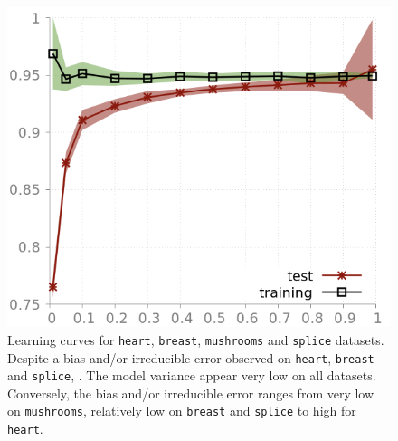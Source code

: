 \documentclass[preprint,12pt]{elsarticle}
\theoremstyle{definition}
\begin{document}
\begin{figure}[!h]
\hfill
\includegraphics[scale=0.3]{img/learning_curve_splice.png}
\caption{Learning curves for \texttt{heart}, \texttt{breast}, \texttt{mushrooms} and \texttt{splice} datasets. Despite a bias and/or irreducible error observed on  \texttt{heart}, \texttt{breast} and \texttt{splice}, . The model variance appear very low on all datasets. Conversely, the bias and/or irreducible error ranges from very low on \texttt{mushrooms}, relatively low on \texttt{breast} and \texttt{splice} to high for \texttt{heart}.}
\label{fig:learning_curve_2}
\end{figure}
\end{document}
